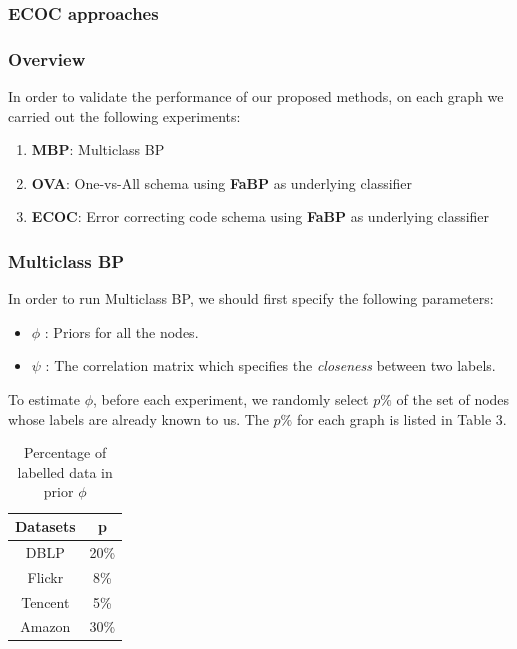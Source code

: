 \subsubsection{ECOC approaches}
\subsubsection*{Overview}
In order to validate the performance of our proposed methods, on each graph we carried out the following experiments:
\begin{enumerate}
	\item \textbf{MBP}: Multiclass BP
	\item \textbf{OVA}: One-vs-All schema using \textbf{FaBP} as underlying classifier
	\item \textbf{ECOC}: Error correcting code schema using \textbf{FaBP} as underlying classifier
\end{enumerate}

\subsubsection*{Multiclass BP}
In order to run Multiclass BP, we should first specify the following parameters:
\begin{itemize}
	\item \textbf{$\phi$} : Priors for all the nodes.
	\item \textbf{$\psi$} : The correlation matrix which specifies the \textit{closeness} between two labels. 
\end{itemize}

To estimate $\phi$, before each experiment, we randomly select $p\%$ of the set of nodes whose labels are already known to us. The $p\%$ for each graph is listed in Table 3.

\begin{table}[!ht]
\centering
\begin{tabular}{c|c}
\toprule
\textbf{Datasets} & \textbf{p}\\
\midrule
DBLP & 20\%\\
Flickr & 8\%\\
Tencent & 5\%\\
Amazon & 30\%\\
\bottomrule
\end{tabular}
\caption{Percentage of labelled data in prior $\phi$}
\end{table} 

